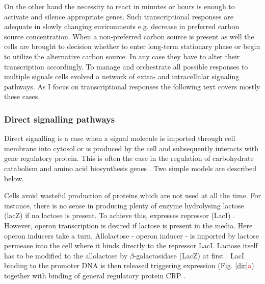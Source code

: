 On the other hand the necessity to react in minutes or hours is enough to activate and silence appropriate genes.
Such transcriptional responses are adequate in slowly changing environments e.g. decrease in preferred carbon source concentration.
When a non-preferred carbon source is present as well the cells are brought to decision whether to enter long-term stationary phase or begin to utilize the alternative carbon source.
In any case they have to alter their transcription accordingly.
To manage and orchestrate all possible responses to multiple signals cells evolved a network of extra- and intracellular signaling pathways.
As I focus on transcriptional responses the following text covers mostly these cases.

\subsubsection{Direct signalling pathways}
Direct signalling is a case when a signal molecule is imported through cell membrane into cytosol or is produced by the cell and subsequently interacts with gene regulatory protein.
This is often the case in the regulation of carbohydrate catabolism and amino acid biosynthesis genes \cite{charlier1992arginine, weickert1992isorepressor, pittard1996various, wheatley2013structural}.
Two simple models are described below.

Cells avoid wasteful production of proteins which are not used at all the time.
For instance, there is no sense in producing plenty of enzyme hydrolysing lactose (lacZ) if no lactose is present.
To achieve this,  expresses  repressor (LacI) \cite{hudson1990co}.
However,  operon transcription is desired if lactose is present in the media.
Here  operon inducers take a turn.
Allolactose -  operon inducer - is imported by lactose permease into the cell where it binds directly to the repressor LacI.
Lactose itself has to be modified to the allolactose by $\beta$-galactosidase (LacZ) at first \cite{jobe1972lac, wheatley2013structural}.
LacI binding to the promoter DNA is then released triggering  expression (Fig. \ref{dir}\textcolor{red}{a}) together with binding of general regulatory protein CRP \cite{hudson1990co, clark2005molecular}.

